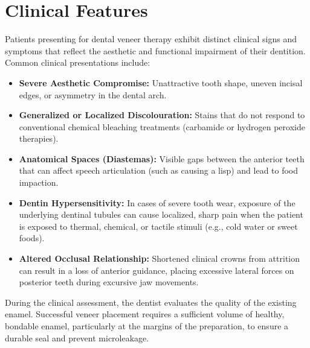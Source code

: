 \section*{Clinical Features}
Patients presenting for dental veneer therapy exhibit distinct clinical signs and symptoms that reflect the aesthetic and functional impairment of their dentition. Common clinical presentations include:
\begin{itemize}
    \item \textbf{Severe Aesthetic Compromise:} Unattractive tooth shape, uneven incisal edges, or asymmetry in the dental arch.
    \item \textbf{Generalized or Localized Discolouration:} Stains that do not respond to conventional chemical bleaching treatments (carbamide or hydrogen peroxide therapies).
    \item \textbf{Anatomical Spaces (Diastemas):} Visible gaps between the anterior teeth that can affect speech articulation (such as causing a lisp) and lead to food impaction.
    \item \textbf{Dentin Hypersensitivity:} In cases of severe tooth wear, exposure of the underlying dentinal tubules can cause localized, sharp pain when the patient is exposed to thermal, chemical, or tactile stimuli (e.g., cold water or sweet foods).
    \item \textbf{Altered Occlusal Relationship:} Shortened clinical crowns from attrition can result in a loss of anterior guidance, placing excessive lateral forces on posterior teeth during excursive jaw movements.
\end{itemize}
During the clinical assessment, the dentist evaluates the quality of the existing enamel. Successful veneer placement requires a sufficient volume of healthy, bondable enamel, particularly at the margins of the preparation, to ensure a durable seal and prevent microleakage.

